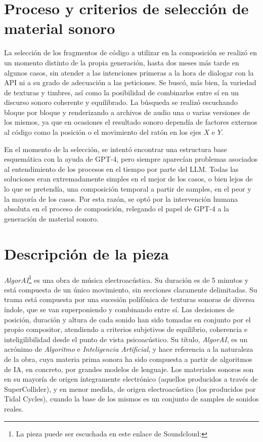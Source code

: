 \section{Proceso y criterios de selección de material sonoro}

La selección de los fragmentos de código a utilizar en la composición se realizó en un momento distinto de la propia generación, hasta dos meses más tarde en algunos casos, sin atender a las intenciones primeras a la hora de dialogar con la API ni a su grado de adecuación a las peticiones. Se buscó, más bien, la variedad de texturas y timbres, así como la posibilidad de combinarlos entre sí en un discurso sonoro coherente y equilibrado. La búsqueda se realizó escuchando bloque por bloque y renderizando a archivos de audio una o varias versiones de los mismos, ya que en ocasiones el resultado sonoro dependía de factores externos al código como la posición o el movimiento del ratón en los ejes $X$ e $Y$. 

En el momento de la selección, se intentó encontrar una estructura base esquemática con la ayuda de GPT-4, pero siempre aparecían problemas asociados al entendimiento de los procesos en el tiempo por parte del LLM. Todas las soluciones eran extremadamente simples en el mejor de los casos, o bien lejos de lo que se pretendía, una composición temporal a partir de samples, en el peor y la mayoría de los casos. Por esta razón, se optó por la intervención humana absoluta en el proceso de composición, relegando el papel de GPT-4 a la generación de material sonoro.

\section{Descripción de la pieza}

\textit{AlgorAI}\footnote{La pieza puede ser escuchada en este enlace de Soundcloud: } es una obra de música electroacústica. Su duración es de 5 minutos y está compuesta de un único movimiento, sin secciones claramente delimitadas. Su trama está compuesta por una sucesión polifónica de texturas sonoras de diversa índole, que se van superponiendo y combinando entre sí. Las decisiones de posición, duración y altura de cada sonido han sido tomadas en conjunto por el propio compositor, atendiendo a criterios subjetivos de equilibrio, coherencia e inteligilibilidad desde el punto de vista psicoacústico. Su título, \textit{AlgorAI}, es un acrónimo de \textit{Algoritmo} e \textit{Inteligencia Artificial}, y hace referencia a la naturaleza de la obra, cuya materia prima sonora ha sido compuesta a partir de algoritmos de IA, en concreto, por grandes modelos de lenguaje. Los materiales sonoros son en su mayoría de origen íntegramente electrónico (aquellos producidos a través de SuperCollider), y en menor medida, de origen electroacústico (los producidos por Tidal Cycles), cuando la base de los mismos es un conjunto de samples de sonidos reales.

